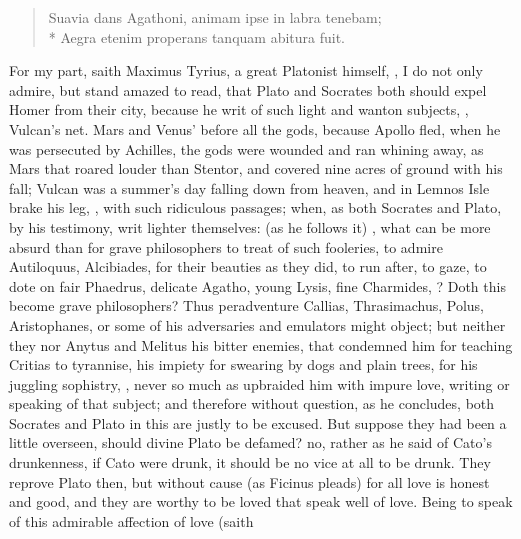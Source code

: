{\begin{latin}
\begin{verse}
Suavia dans Agathoni, animam ipse in labra tenebam;\\*
Aegra etenim properans tanquam abitura fuit.
\end{verse}
\end{latin}

For my part, saith Maximus Tyrius, a great Platonist himself, , I do not only admire, but
stand amazed to read, that Plato and Socrates both should expel Homer
from their city, because he writ of such light and wanton subjects,
, Vulcan's net. Mars and Venus'  before all the gods,
because Apollo fled, when he was persecuted by Achilles, the gods
were wounded and ran whining away, as Mars that roared louder than
Stentor, and covered nine acres of ground with his fall; Vulcan was a
summer's day falling down from heaven, and in Lemnos Isle brake his
leg, \etc{}, with such ridiculous passages; when, as both Socrates and
Plato, by his testimony, writ lighter themselves: 
(as he follows it) , what can be more absurd than for grave philosophers to treat
of such fooleries, to admire Autiloquus, Alcibiades, for their beauties
as they did, to run after, to gaze, to dote on fair Phaedrus, delicate
Agatho, young Lysis, fine Charmides, ? Doth
this become grave philosophers? Thus peradventure Callias,
Thrasimachus, Polus, Aristophanes, or some of his adversaries and
emulators might object; but neither they nor Anytus and Melitus
his bitter enemies, that condemned him for teaching Critias to
tyrannise, his impiety for swearing by dogs and plain trees, for his
juggling sophistry, \etc{}, never so much as upbraided him with impure
love, writing or speaking of that subject; and therefore without
question, as he concludes, both Socrates and Plato in this are justly
to be excused. But suppose they had been a little overseen, should
divine Plato be defamed? no, rather as he said of Cato's drunkenness,
if Cato were drunk, it should be no vice at all to be drunk. They
reprove Plato then, but without cause (as Ficinus pleads) for all
love is honest and good, and they are worthy to be loved that speak
well of love. Being to speak of this admirable affection of love (saith
}
